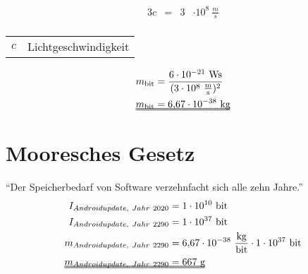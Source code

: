 \documentclass[aspectratio=169]{beamer}
\makeatletter
\newenvironment{conditions}
{\par\vspace{\abovedisplayskip}\noindent\begin{tabular}{>{$}l<{$} @{${}\hspace{0.1cm}.\hspace{0.03cm}.\hspace{0.25cm}{}$} l}}
	{\end{tabular}\par\vspace{\belowdisplayskip}}
\makeatother
\begin{document}
\centering\begin{frame}[fragile]{\insertsection}{\insertsubsection}
\begin{alignat}{3}
c & = & 3 & \cdot 10^{8}\ \unit{\frac{m}{s}}  \\
\end{alignat}
\begin{conditions}
	c & Lichtgeschwindigkeit \\
\end{conditions}
\end{frame}

\centering\begin{frame}[fragile]{\insertsection}{\insertsubsection}
\begin{alignat}{2}
m_{\unit{bit}} & = \frac{6 \cdot 10^{-21}\ \unit{Ws}}{(3\cdot 10^8\ \unit{\frac{m}{s}})^2} \\
\makebox[0pt][l]{\uuline{\phantom{$m_{\unit{bit}} = 6{,}67 \cdot 10^{-38}\ \unit{kg}$}}}
m_{\unit{bit}} & = 6{,}67 \cdot 10^{-38}\ \unit{kg}
\end{alignat}
\end{frame}

\section{Mooresches Gesetz}
\centering\begin{frame}[fragile]{\insertsection}{\insertsubsection}
"`Der Speicherbedarf von Software verzehnfacht sich alle zehn Jahre."'
\begin{alignat}{2}
I_{Androidupdate,\ Jahr\ 2020} & =  1  \cdot 10^{10}\ \unit{bit}  \\
I_{Androidupdate,\ Jahr\ 2290} & =  1  \cdot 10^{37}\ \unit{bit}  \\
m_{Androidupdate,\ Jahr\ 2290} & =  6{,}67  \cdot 10^{-38}\ \unit{\frac{kg}{bit}} \cdot 1 \cdot 10^{37}\ \unit{bit}  \\
\makebox[0pt][l]{\uuline{\phantom{$m_{Androidupdate,\ Jahr\ 2290} =  667\ \unit{g}$}}}
m_{Androidupdate,\ Jahr\ 2290} & =  667\ \unit{g}    \\
\end{alignat}
\end{frame}
\end{document}
